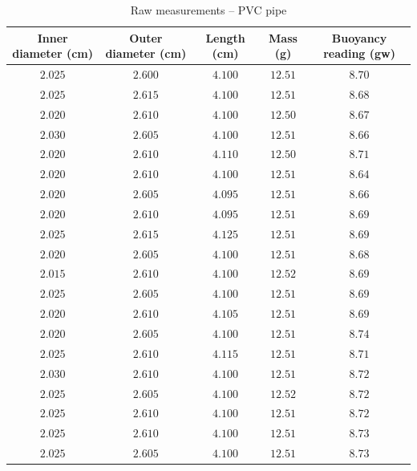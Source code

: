 \begin{table}[htb!]
\centering
\caption{Raw measurements -- PVC pipe}
\begin{tabular}{ccccc}
\toprule
Inner diameter (\unit{\cm}) & Outer diameter (\unit{\cm}) & Length (\unit{\cm}) & Mass (\unit{\g}) & Buoyancy reading (\unit{gw}) \\
\midrule
$2.025$ & $2.600$ & $4.100$ & $12.51$ & $8.70$ \\
$2.025$ & $2.615$ & $4.100$ & $12.51$ & $8.68$ \\
$2.020$ & $2.610$ & $4.100$ & $12.50$ & $8.67$ \\
$2.030$ & $2.605$ & $4.100$ & $12.51$ & $8.66$ \\
$2.020$ & $2.610$ & $4.110$ & $12.50$ & $8.71$ \\
$2.020$ & $2.610$ & $4.100$ & $12.51$ & $8.64$ \\
$2.020$ & $2.605$ & $4.095$ & $12.51$ & $8.66$ \\
$2.020$ & $2.610$ & $4.095$ & $12.51$ & $8.69$ \\
$2.025$ & $2.615$ & $4.125$ & $12.51$ & $8.69$ \\
$2.020$ & $2.605$ & $4.100$ & $12.51$ & $8.68$ \\
$2.015$ & $2.610$ & $4.100$ & $12.52$ & $8.69$ \\
$2.025$ & $2.605$ & $4.100$ & $12.51$ & $8.69$ \\
$2.020$ & $2.610$ & $4.105$ & $12.51$ & $8.69$ \\
$2.020$ & $2.605$ & $4.100$ & $12.51$ & $8.74$ \\
$2.025$ & $2.610$ & $4.115$ & $12.51$ & $8.71$ \\
$2.030$ & $2.610$ & $4.100$ & $12.51$ & $8.72$ \\
$2.025$ & $2.605$ & $4.100$ & $12.52$ & $8.72$ \\
$2.025$ & $2.610$ & $4.100$ & $12.51$ & $8.72$ \\
$2.025$ & $2.610$ & $4.100$ & $12.51$ & $8.73$ \\
$2.025$ & $2.605$ & $4.100$ & $12.51$ & $8.73$ \\
\bottomrule
\end{tabular}
\end{table}
